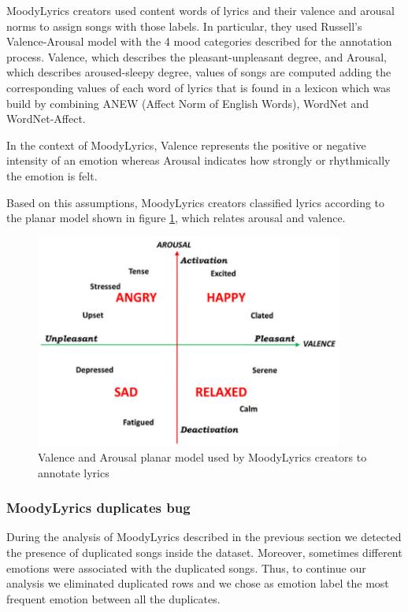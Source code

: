 MoodyLyrics creators used content words of lyrics and their valence and arousal norms to assign songs with those labels.
In particular, they used Russell's Valence-Arousal model with the 4 mood categories described for the annotation process\cite{russell1980circumplex}. Valence, which describes the pleasant-unpleasant degree, and Arousal, which describes aroused-sleepy degree, values of songs are computed adding the corresponding values of each word of lyrics that is found in a lexicon which was build by combining ANEW (Affect Norm of English Words), WordNet and WordNet-Affect. 

In the context of MoodyLyrics, Valence represents the positive or negative intensity of an emotion whereas Arousal indicates how strongly or rhythmically the emotion is felt\cite{moodylyrics}.

Based on this assumptions, MoodyLyrics creators classified lyrics according to the planar model shown in figure \ref{fig:ml-classification-schema}, which relates arousal and valence.

\begin{figure}
  \centering
  \includegraphics[width=0.9\textwidth]{./chapters/chapter4/images/moodylyrics-classification-schema}
  \caption{Valence and Arousal planar model used by MoodyLyrics creators to annotate lyrics\cite{moodylyrics}}
  \label{fig:ml-classification-schema}
\end{figure}

\subsubsection{MoodyLyrics duplicates bug}

During the analysis of MoodyLyrics described in the previous section we detected the presence of duplicated songs inside the dataset. Moreover, sometimes different emotions were associated with the duplicated songs. Thus, to continue our analysis we eliminated duplicated rows and we chose as emotion label the most frequent emotion between all the duplicates.\par


